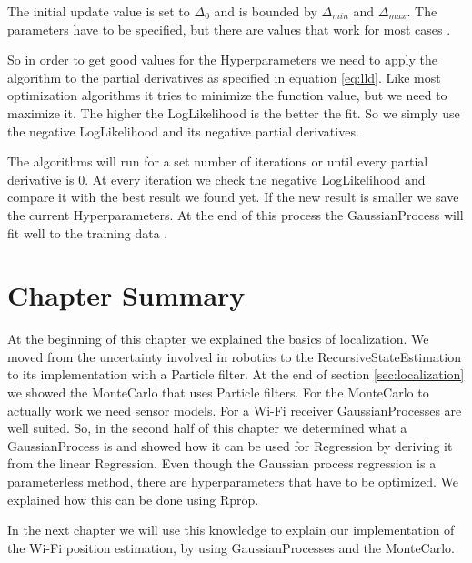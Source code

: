 The initial update value is set to $\Delta_0$ and is bounded by $\Delta_{min}$ and $\Delta_{max}$. The parameters have to be specified, but there are values that work for most cases \citep{blum2013optimization}. 

So in order to get good values for the \gls{Hyperparameter}s we need to apply the algorithm to the partial derivatives as specified in equation \ref{eq:lld}. Like most optimization algorithms it tries to minimize the function value, but we need to maximize it. The higher the \gls{LogLikelihood} is the better the fit. So we simply use the negative \gls{LogLikelihood} and its negative partial derivatives. 

The algorithms will run for a set number of iterations or until every partial derivative is 0. At every iteration we check the negative \gls{LogLikelihood} and compare it with the best result we found yet. If the new result is smaller we save the current \gls{Hyperparameter}s. At the end of this process the \Gls{GaussianProcess} will fit well to the training data \citep{blum2013optimization}.

\section{Chapter Summary}
At the beginning of this chapter we explained the basics of localization. We moved from the uncertainty involved in robotics to the \gls{RecursiveStateEstimation} to its implementation with a \gls{Particle} filter. At the end of section \ref{sec:localization} we showed the \Gls{MonteCarlo} that uses \gls{Particle} filters. For the \Gls{MonteCarlo} to actually work we need sensor models. For a Wi-Fi receiver \Gls{GaussianProcess}es are well suited. 
So, in the second half of this chapter we determined what a \Gls{GaussianProcess} is and showed how it can be used for \gls{Regression} by deriving it from the linear \gls{Regression}. Even though the Gaussian process regression is a parameterless method, there are hyperparameters that have to be optimized. We explained how this can be done using \Gls{Rprop}. 

In the next chapter we will use this knowledge to explain our implementation of the Wi-Fi position estimation, by using \Gls{GaussianProcess}es and the \Gls{MonteCarlo}. 